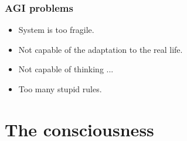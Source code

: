 \documentclass[12pt, aspectratio=169]{beamer}
\begin{document}
\begin{frame}
  \frametitle{AGI problems}
  \begin{itemize}
    \item System is too fragile.
    \item Not capable of the adaptation to the real life.
    \item Not capable of thinking ...
    \item Too many stupid rules.
  \end{itemize}
\end{frame}


\section{The consciousness} %
\end{document}

